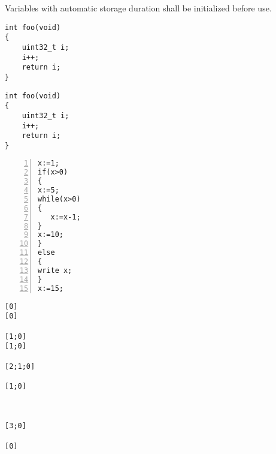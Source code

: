 \documentclass{article}
\begin{document}
Variables with automatic storage duration shall be initialized before use.

\begin{minipage}{.48\textwidth}
\begin{lstlisting}
int foo(void)
{
	uint32_t i;
	i++;
	return i;
}
\end{lstlisting}
\end{minipage}

\begin{minipage}{.48\textwidth}
\begin{lstlisting}
int foo(void)
{
	uint32_t i;
	i++;
	return i;
}
\end{lstlisting}
\end{minipage}


\begin{minipage}[b]{0.45\linewidth}
\centering
\lstset{language=C,label=SliceExaple}
\begin{lstlisting}[frame=single, numbers=left, mathescape,%
   caption={Example WHILE code snippet with nested scopes.}, label=scopingExample]
x:=1;
if(x>0)
{
x:=5;
while(x>0)
{
   x:=x-1;
}
x:=10;
}
else
{
write x;
}
x:=15;
\end{lstlisting}
\end{minipage}
\hspace{0.5cm}
\begin{minipage}[b]{0.45\linewidth}
\centering
\begin{lstlisting}[frame=single, mathescape,%
   title={Contents of scopesEntered for each block.}, label=scopesEnteredContents]
[0]
[0]
 
[1;0]
[1;0]
 
[2;1;0]
 
[1;0]
 
 
 
[3;0]
 
[0]
\end{lstlisting}
\end{minipage}
\end{document}
